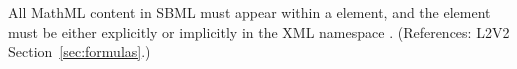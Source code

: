 All MathML content in SBML must appear within a 
element, and the  element must be either explicitly or
implicitly in the XML namespace
.  (References: L2V2
Section~\ref{sec:formulas}.)
